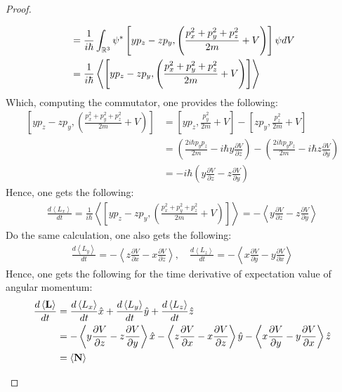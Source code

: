\documentclass{article}
\begin{document}
\begin{proof}
\begin{itemize}
\begin{align}
            &= \frac{1}{i\hbar}\int_{\mathbb{R}^3}\psi^*\left[yp_z-zp_y,\left(\frac{p_x^2+p_y^2+p_z^2}{2m}+V\right)\right]\psi dV\\
            &= \frac{1}{i\hbar}\left<\left[yp_z-zp_y,\left(\frac{p_x^2+p_y^2+p_z^2}{2m}+V\right)\right]\right>
        \end{align}
        Which, computing the commutator, one provides the following:
        \begin{align}
            \left[yp_z-zp_y,\left(\frac{p_x^2+p_y^2+p_z^2}{2m}+V\right)\right] &= \left[yp_z, \frac{p_y^2}{2m}+V\right]-\left[zp_y, \frac{p_z^2}{2m}+V\right]\\
            &= \left(\frac{2i\hbar p_yp_z}{2m}-i\hbar y\frac{\partial V}{\partial z}\right)-\left(\frac{2i\hbar p_yp_z}{2m}-i\hbar z\frac{\partial V}{\partial y}\right)\\
            &= -i\hbar\left(y\frac{\partial V}{\partial z}-z\frac{\partial V}{\partial y}\right)
        \end{align}
        Hence, one gets the following:
        \begin{align}
            \frac{d\left<L_x\right>}{dt} = \frac{1}{i\hbar}\left<\left[yp_z-zp_y,\left(\frac{p_x^2+p_y^2+p_z^2}{2m}+V\right)\right]\right> = -\left<y\frac{\partial V}{\partial z}-z\frac{\partial V}{\partial y}\right>
        \end{align}
        Do the same calculation, one also gets the following:
        \begin{align}
            \frac{d\left<L_y\right>}{dt} = -\left<z\frac{\partial V}{\partial x}-x\frac{\partial V}{\partial z}\right>,\quad \frac{d\left<L_z\right>}{dt} = -\left<x\frac{\partial V}{\partial y}-y\frac{\partial V}{\partial x}\right>
        \end{align}Hence, one gets the following for the time derivative of expectation value of angular momentum:
        \begin{align}
            \frac{d\left<\mathbf{L}\right>}{dt} &= \frac{d\left<L_x\right>}{dt}\hat{x}+\frac{d\left<L_y\right>}{dt}\hat{y}+\frac{d\left<L_z\right>}{dt}\hat{z}\\
            &= -\left<y\frac{\partial V}{\partial z}-z\frac{\partial V}{\partial y}\right>\hat{x}-\left<z\frac{\partial V}{\partial x}-x\frac{\partial V}{\partial z}\right>\hat{y}-\left<x\frac{\partial V}{\partial y}-y\frac{\partial V}{\partial x}\right>\hat{z}\\
            &= \left<\mathbf{N}\right>
        \end{align}


\end{itemize}
\end{proof}
\end{document}
